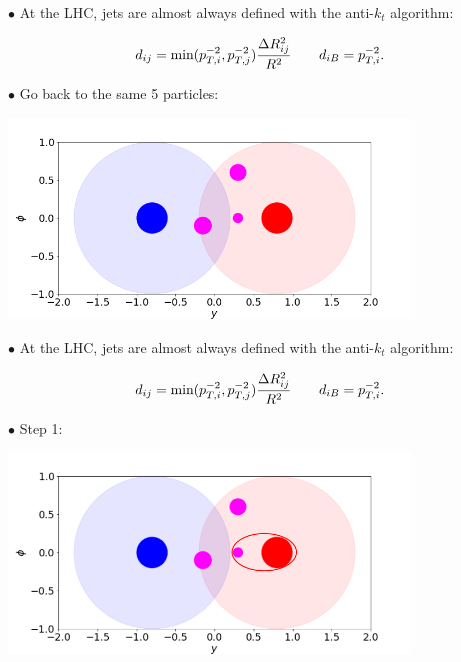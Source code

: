 \documentclass[9pt,a4paper,unknownkeysallowed,xcolor=dvipsnames,aspectratio=43]{beamer}
\begin{document}
%
%
\begin{frame}

{\color{darkred}\Large$\bullet$} {\color{darkred} At the LHC, jets are almost always defined with the anti-$k_t$ algorithm:}

  \begin{equation}
    d_{ij} = \text{min}(p_{T,i}^{-2},p_{T,j}^{-2})\frac{\Delta R_{ij}^2}{R^2}\qquad d_{iB} = p_{T,i}^{-2}.
  \notag\end{equation}
 \vspace{2mm}
  
{\color{darkred}\Large$\bullet$} Go back to the same 5 particles:
\vspace{2mm}
\begin{center}
\includegraphics[width=0.8\textwidth]{kt0.png}
\end{center}
\end{frame}
%
%
\begin{frame}

{\color{darkred}\Large$\bullet$} {\color{darkred} At the LHC, jets are almost always defined with the anti-$k_t$ algorithm:}

  \begin{equation}
    d_{ij} = \text{min}(p_{T,i}^{-2},p_{T,j}^{-2})\frac{\Delta R_{ij}^2}{R^2}\qquad d_{iB} = p_{T,i}^{-2}.
  \notag\end{equation}
 \vspace{2mm}
  
{\color{darkred}\Large$\bullet$} Step 1:
\vspace{2mm}
\begin{center}
\includegraphics[width=0.8\textwidth]{antikt01.png}
\end{center}
\end{frame}
\end{document}
